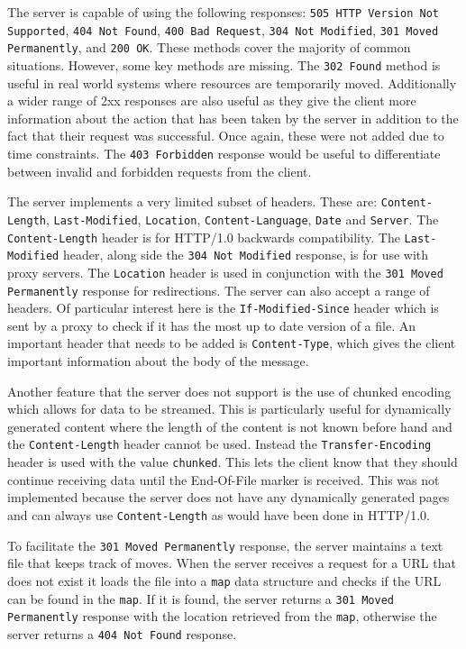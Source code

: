 \documentclass[10pt,twocolumn]{witseiepaper}
\begin{document}
	The server is capable of using the following responses: \texttt{505 HTTP Version Not Supported}, \texttt{404 Not Found}, \texttt{400 Bad Request}, \texttt{304 Not Modified}, \texttt{301 Moved Permanently}, and \texttt{200 OK}. These methods cover the majority of common situations. However, some key methods are missing. The \texttt{302 Found} method is useful in real world systems where resources are temporarily moved. Additionally a wider range of 2xx responses are also useful as they give the client more information about the action that has been taken by the server in addition to the fact that their request was successful. Once again, these were not added due to time constraints. The \texttt{403 Forbidden} response would be useful to differentiate between invalid and forbidden requests from the client.

	The server implements a very limited subset of headers. These are: \texttt{Content-Length}, \texttt{Last-Modified}, \texttt{Location}, \texttt{Content-Language}, \texttt{Date} and \texttt{Server}. The \texttt{Content-Length} header is for HTTP/1.0 backwards compatibility. The \texttt{Last-Modified} header, along side the \texttt{304 Not Modified} response, is for use with proxy servers. The \texttt{Location} header is used in conjunction with the \texttt{301 Moved Permanently} response for redirections. The server can also accept a range of headers. Of particular interest here is the \texttt{If-Modified-Since} header which is sent by a proxy to check if it has the most up to date version of a file. An important header that needs to be added is \texttt{Content-Type}, which gives the client important information about the body of the message. 

	Another feature that the server does not support is the use of chunked encoding which allows for data to be streamed. This is particularly useful for dynamically generated content where the length of the content is not known before hand and the \texttt{Content-Length} header cannot be used. Instead the \texttt{Transfer-Encoding} header is used with the value \texttt{chunked}. This lets the client know that they should continue receiving data until the End-Of-File marker is received. This was not implemented because the server does not have any dynamically generated pages and can always use \texttt{Content-Length} as would have been done in HTTP/1.0.

	To facilitate the \texttt{301 Moved Permanently} response, the server maintains a text file that keeps track of moves. When the server receives a request for a URL that does not exist it loads the file into a \texttt{map} data structure and checks if the URL can be found in the \texttt{map}. If it is found, the server returns a \texttt{301 Moved Permanently} response with the location retrieved from the \texttt{map}, otherwise the server returns a \texttt{404 Not Found} response.	
\end{document}

